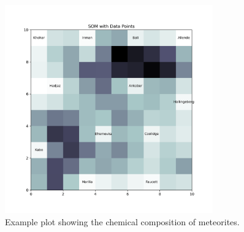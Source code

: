 \begin{figure}[H]
    \centering
    \includegraphics[width=0.8\textwidth]{handin/figures/som_with_data_points.png}
    \caption{Example plot showing the chemical composition of meteorites.}
    \label{fig:stacked}
\end{figure}